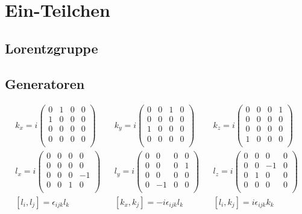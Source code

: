 \documentclass[10pt,a4paper,notitlepage]{scrartcl}
\begin{document}
\section{Ein-Teilchen}
\subsection*{Lorentzgruppe}

\subsection*{Generatoren}

\begin{align*} 
    k_x = i \begin{pmatrix}
        0 & 1 & 0 & 0 \\
        1 & 0 & 0 & 0 \\
        0 & 0 & 0 & 0 \\
        0 & 0 & 0 & 0 \\
    \end{pmatrix} 
    &&
    k_y = i \begin{pmatrix}
        0 & 0 & 1 & 0 \\
        0 & 0 & 0 & 0 \\
        1 & 0 & 0 & 0 \\
        0 & 0 & 0 & 0 \\
    \end{pmatrix}&
    &
     k_z = i \begin{pmatrix}
        0 & 0 & 0 & 1 \\
        0 & 0 & 0 & 0 \\
        0 & 0 & 0 & 0 \\
        1 & 0 & 0 & 0 \\
    \end{pmatrix}\\
     l_x = i \begin{pmatrix}
        0 & 0 & 0 & 0 \\
        0 & 0 & 0 & 0 \\
        0 & 0 & 0 & -1 \\
        0 & 0 & 1 & 0 \\
    \end{pmatrix} 
    &&
    l_y = i \begin{pmatrix}
        0 & 0 & 0 & 0 \\
        0 & 0 & 0 & 1 \\
        0 & 0 & 0 & 0 \\
        0 & -1 & 0 & 0 \\
    \end{pmatrix}&
    &
     l_z = i \begin{pmatrix}
        0 & 0 & 0 & 0 \\
        0 & 0 & -1 & 0 \\
        0 & 1 & 0 & 0 \\
        0 & 0 & 0 & 0 \\
    \end{pmatrix}\\
    [l_i, l_j] = \epsilon_{ijk}l_k &&
    [k_x, k_j] = -i\epsilon_{ijk}l_k &&
    [l_i, k_j] = i\epsilon_{ijk}k_k\\
\end{align*}
\end{document}
